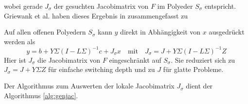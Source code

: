 wobei gerade $J_\sigma$ der gesuchten Jacobimatrix von $F$ im Polyeder $S_\sigma$ entspricht. 
Griewank et al. haben dieses Ergebnis in \cite[Proposition 2.2]{plan} zusammengefasst zu  
\begin{theorem}
Auf allen offenen Polyedern $S_\sigma$ kann $y$ direkt in Abhängigkeit von $x$ ausgedrückt werden als
\begin{equation}
y = b+Y\Sigma(I-L\Sigma)^{-1}c + J_\sigma x  \quad \text{mit} \quad J_\sigma = J+Y\Sigma(I-L\Sigma)^{-1} Z
\label{eq:explJacRepresentation}
\end{equation}
Hier ist $J_\sigma$ die Jacobimatrix von $F$ eingeschränkt auf $S_\sigma$. Sie reduziert sich zu $J_\sigma=J+Y\Sigma Z$ für einfache switching depth und zu $J$ für glatte Probleme.
\end{theorem}

Der Algorithmus zum Auswerten der lokale Jacobimatrix $J_\sigma$ dient der Algorithmus \ref{alg:genjac}.


